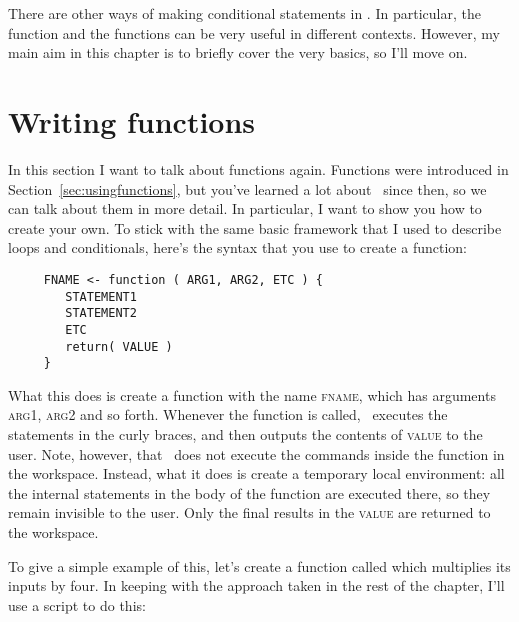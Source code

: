 There are other ways of making conditional statements in \R. In particular, the  function and the  functions can be very useful in different contexts. However, my main aim in this chapter is to briefly cover the very basics, so I'll move on.





\section{Writing functions\label{sec:functions}}

In this section I want to talk about functions again. Functions were introduced in Section~\ref{sec:usingfunctions}, but you've learned a lot about \R\ since then, so we can talk about them in more detail. In particular, I want to show you how to create your own. To stick with the same basic framework that I used to describe loops and conditionals, here's the syntax that you use to create a function:
\begin{verbatim}
     FNAME <- function ( ARG1, ARG2, ETC ) {
        STATEMENT1
        STATEMENT2
        ETC
        return( VALUE )
     }
\end{verbatim} 
What this does is create a function with the name \textsc{fname}, which has arguments \textsc{arg1}, \textsc{arg2} and so forth. Whenever the function is called, \R\ executes the statements in the curly braces, and then outputs the contents of \textsc{value} to the user. Note, however, that \R\ does not execute the commands inside the function in the workspace. Instead, what it does is create a temporary local environment: all the internal statements in the body of the function are executed there, so they remain invisible to the user. Only the final results in the \textsc{value} are returned to the workspace.

To give a simple example of this, let's create a function called  which multiplies its inputs by four. In keeping with the approach taken in the rest of the chapter, I'll use a script to do this:

